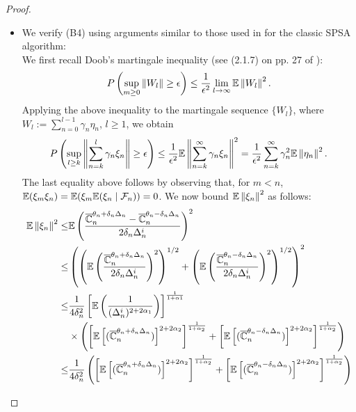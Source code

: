 \begin{proof}
\begin{itemize}
\item We verify (B4) using arguments similar to those used in \cite{spall} for the classic SPSA algorithm:\\
We first recall Doob's martingale inequality (see (2.1.7) on pp. 27 of \cite{kushner-clark}):
\begin{align}
P\left( \sup_{m\geq 0}   \left\|W_l\right\| \geq \epsilon \right) \le \dfrac{1}{\epsilon^2} \lim_{l\rightarrow \infty} \mathbb{E} \left\|W_l\right\|^2. 
\end{align}
Applying the above inequality to the martingale sequence $\{W_l\}$, where  $W_l := \sum_{n=0}^{l-1} \gamma_n \eta_n$, $l\ge 1$, we obtain
\begin{align}
P\left( \sup_{l\geq k}   \left\|\sum_{n=k}^{l} \gamma_n \xi_n\right\| \geq \epsilon \right) \le \dfrac{1}{\epsilon^2} \mathbb{E} \left\|
\sum_{n=k}^{\infty} \gamma_n \xi_n\right\|^2 = \dfrac{1}{\epsilon^2} \sum_{n=k}^{\infty} \gamma_n^2 \mathbb{E}\left\| \eta_n\right\|^2. \label{eq:b4}
\end{align}
The last equality above follows by observing that, for $m < n$, $\mathbb{E}(\xi_m \xi_n) = \mathbb{E}(\xi_m \mathbb{E}(\xi_n\mid \mathcal{F}_n))=0$.
We now bound $\mathbb{E}\left\| \xi_n\right\|^2$ as follows:
\begin{align}
\E\left\| \xi_n\right\|^2\le &\E\left(\dfrac{\overline \C_n^{\theta_n + \delta_n \Delta_n} -\overline \C_n^{\theta_n - \delta_n \Delta_n}}{2 \delta_n \Delta_n^i}\right)^2 \label{eq:mi}\\
\le &\left(\left(\E\left(\dfrac{\overline \C_n^{\theta_n + \delta_n \Delta_n}}{2 \delta_n \Delta_n^i}\right)^2\right)^{1/2}
+ \left(\E\left(\dfrac{\overline \C_n^{\theta_n - \delta_n \Delta_n}}{2 \delta_n \Delta_n^i}\right)^2\right)^{1/2}\right)^2 \label{eq:minko}\\
\le &\frac1{4\delta_n^2} \left[ \E\left(\frac1{(\Delta_n^i)^{2+2\alpha_1}}\right) \right]^{\frac{1}{1+\alpha1}} \nonumber\\
& \times \left(\left[\E\left[ (\overline \C_n^{\theta_n + \delta_n \Delta_n})\right]^{2+2\alpha_2}\right]^{\frac{1}{1+\alpha_2}} +
\left[\E\left[ (\overline \C_n^{\theta_n - \delta_n \Delta_n})\right]^{2+2\alpha_2}\right]^{\frac{1}{1+\alpha_2}}\right)\label{eq:holder}\\
\le &\frac1{4\delta_n^2} \left(\left[\E\left[ (\overline \C_n^{\theta_n + \delta_n \Delta_n})\right]^{2+2\alpha_2}\right]^{\frac{1}{1+\alpha_2}} +
\left[\E\left[ (\overline \C_n^{\theta_n - \delta_n \Delta_n})\right]^{2+2\alpha_2}\right]^{\frac{1}{1+\alpha_2}}\right) \label{eq:h2}\\

\end{align}
\end{itemize}
\end{proof}
